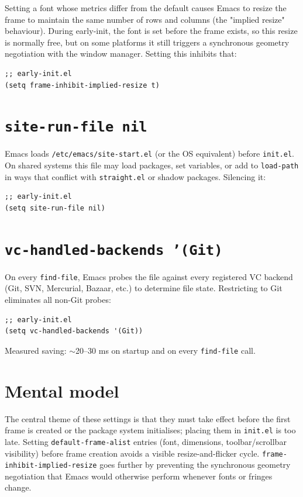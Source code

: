 Setting a font whose metrics differ from the default causes Emacs to resize the frame to maintain the same number of rows and columns (the "implied resize" behaviour). During early-init, the font is set before the frame exists, so this resize is normally free, but on some platforms it still triggers a synchronous geometry negotiation with the window manager. Setting this inhibits that:

\begin{verbatim}
;; early-init.el
(setq frame-inhibit-implied-resize t)
\end{verbatim}

\section{\texttt{site-run-file nil}}\label{site-run-file-nil}

Emacs loads \texttt{/etc/emacs/site-start.el} (or the OS equivalent) before \texttt{init.el}. On shared systems this file may load packages, set variables, or add to \texttt{load-path} in ways that conflict with \texttt{straight.el} or shadow packages. Silencing it:

\begin{verbatim}
;; early-init.el
(setq site-run-file nil)
\end{verbatim}

\section{\texttt{vc-handled-backends '(Git)}}\label{vc-handled-backends-git}

On every \texttt{find-file}, Emacs probes the file against every registered VC backend (Git, SVN, Mercurial, Bazaar, etc.) to determine file state. Restricting to Git eliminates all non-Git probes:

\begin{verbatim}
;; early-init.el
(setq vc-handled-backends '(Git))
\end{verbatim}

Measured saving: \(\sim\)20--30 ms on startup and on every \texttt{find-file} call.

\section{Mental model}
The central theme of these settings is that they must take effect before the first frame is created or the package system initialises; placing them in \texttt{init.el} is too late.  Setting \texttt{default-frame-alist} entries (font, dimensions, toolbar/scrollbar visibility) before frame creation avoids a visible resize-and-flicker cycle.  \texttt{frame-inhibit-implied-resize} goes further by preventing the synchronous geometry negotiation that Emacs would otherwise perform whenever fonts or fringes change.

